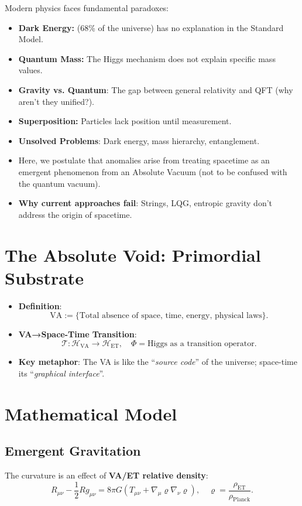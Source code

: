 \documentclass[a4paper]{article}
\theoremstyle{definition}
\theoremstyle{remark}
\numberwithin{equation}{section}
\begin{document}
\noindent Modern physics faces fundamental paradoxes:\\

\begin{itemize}
	\item \textbf{Dark Energy:} (68\% of the universe) has no explanation in the Standard Model.
	\item \textbf{Quantum Mass:} The Higgs mechanism does not explain specific mass values.
	\item \textbf{Gravity vs. Quantum}: The gap between general relativity and QFT (why aren't they unified?).
	\item \textbf{Superposition:} Particles lack position until measurement.
	\item \textbf{Unsolved Problems}: Dark energy, mass hierarchy, entanglement.
	\item Here, we postulate that anomalies arise from treating spacetime as an emergent phenomenon from an Absolute Vacuum (not to be confused with the quantum vacuum).
	\item \textbf{Why current approaches fail}: Strings, LQG, entropic gravity don't address the origin of spacetime.
\end{itemize}
	
	
\section{The Absolute Void: Primordial Substrate}
\label{sec:VA}
\begin{itemize}
	\item \textbf{Definition}:
	\[
	\text{VA} := \{\text{Total absence of space, time, energy, physical laws}\}.
	\]
	\item \textbf{VA→Space-Time Transition}:
	\[
	\mathcal{T} \colon \mathcal{H}_{\text{VA}} \to \mathcal{H}_{\text{ET}}, \quad \Phi = \text{Higgs as a transition operator}.
	\]
	\item \textbf{Key metaphor}: The VA is like the ``\textit{source code}'' of the universe; space-time its ``\textit{graphical interface}''.
\end{itemize}
	

\section{Mathematical Model}
\label{sec:model}
\subsection{Emergent Gravitation}
The curvature is an effect of \textbf{VA/ET relative density}:
\[
R_{\mu\nu} - \frac{1}{2}R g_{\mu\nu} = 8\pi G \left( T_{\mu\nu} + \nabla_\mu \varrho \nabla_\nu \varrho \right), \quad \varrho = \frac{\rho_{\text{ET}}}{\rho_{\text{Planck}}}.
\]
\end{document}
